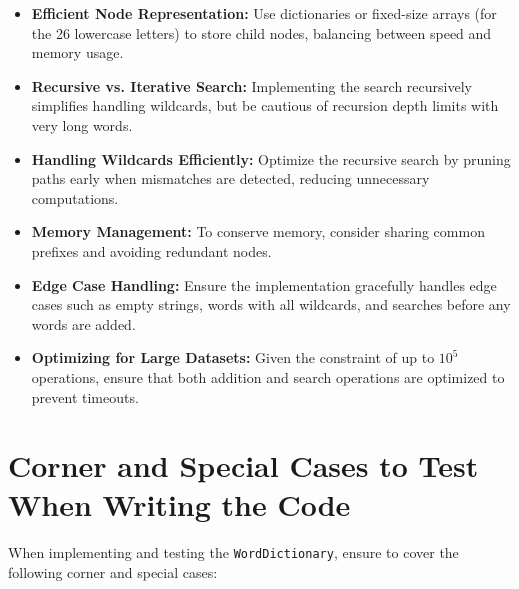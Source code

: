 \begin{itemize}
    \item \textbf{Efficient Node Representation:}  
    Use dictionaries or fixed-size arrays (for the 26 lowercase letters) to store child nodes, balancing between speed and memory usage.
    
    \item \textbf{Recursive vs. Iterative Search:}  
    Implementing the search recursively simplifies handling wildcards, but be cautious of recursion depth limits with very long words.
    
    \item \textbf{Handling Wildcards Efficiently:}  
    Optimize the recursive search by pruning paths early when mismatches are detected, reducing unnecessary computations.
    
    \item \textbf{Memory Management:}  
    To conserve memory, consider sharing common prefixes and avoiding redundant nodes.
    
    \item \textbf{Edge Case Handling:}  
    Ensure the implementation gracefully handles edge cases such as empty strings, words with all wildcards, and searches before any words are added.
    
    \item \textbf{Optimizing for Large Datasets:}  
    Given the constraint of up to \(10^5\) operations, ensure that both addition and search operations are optimized to prevent timeouts.
\end{itemize}

\section*{Corner and Special Cases to Test When Writing the Code}

When implementing and testing the \texttt{WordDictionary}, ensure to cover the following corner and special cases:

